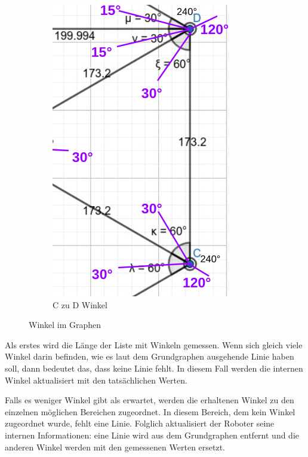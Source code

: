 \begin{figure}[H]
\begin{subfigure}{0.38\textwidth}
\includegraphics[width=0.95\linewidth]{assets/informatik-prototyp/c-d-angle.png} 
\caption{C zu D Winkel}
\label{fig:excerpt-angled-graph}
\end{subfigure}
\caption{Winkel im Graphen}
\label{fig:angles}
\end{figure}

Als erstes wird die Länge der Liste mit Winkeln gemessen. Wenn sich gleich viele Winkel darin befinden, wie es laut dem Grundgraphen ausgehende Linie haben soll, dann bedeutet das, dass keine Linie fehlt. In diesem Fall werden die internen Winkel aktualisiert mit den tatsächlichen Werten. 

Falls es weniger Winkel gibt als erwartet, werden die erhaltenen Winkel zu den einzelnen möglichen Bereichen zugeordnet. In diesem Bereich, dem kein Winkel zugeordnet wurde, fehlt eine Linie. Folglich aktualisiert der Roboter seine internen Informationen: eine Linie wird aus dem Grundgraphen entfernt und die anderen Winkel werden mit den gemessenen Werten ersetzt.

